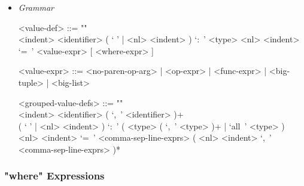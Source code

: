 \documentclass{article}
\begin{document}
\begin{itemize}
\item \textit{Grammar}
\begin{grammar}
<value-def> ::= ""\\
<indent> <identifier> 
( ` ' | <nl> <indent> ) `:\ ' <type> 
<nl> <indent> `=\ ' <value-expr> [ <where-expr> ]

<value-expr> ::=
<no-paren-op-arg> | <op-expr> | <func-expr> | <big-tuple> | <big-list>

<grouped-value-defs> ::= ""\\
<indent> <identifier> ( `,\ ' <identifier> )+ \\
( ` ' | <nl> <indent> ) `:\ ' ( <type> ( `,\ ' <type> )+ | `all\ ' <type> ) \\
<nl> <indent> `=\ '
<comma-sep-line-exprs> ( <nl> <indent> `,\ ' <comma-sep-line-exprs> )*
\end{grammar}

\end{itemize}

\subsubsection{"where" Expressions}
\end{document}
